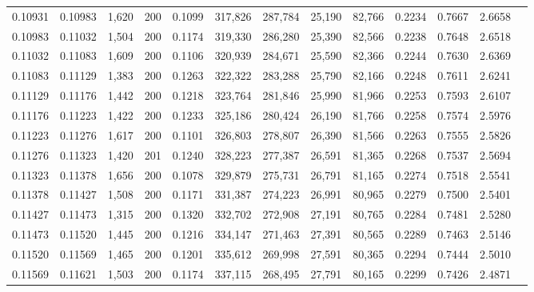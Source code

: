 \begin{tabular}{rrrrrrrrrrrrr}
0.10931 & 0.10983 & 1,620 & 200 &                                     0.1099 & 317,826 & 287,784 &  25,190 &  82,766 & 0.2234 & 0.7667 & 2.6658 \\
0.10983 & 0.11032 & 1,504 & 200 &                                     0.1174 & 319,330 & 286,280 &  25,390 &  82,566 & 0.2238 & 0.7648 & 2.6518 \\
0.11032 & 0.11083 & 1,609 & 200 &                                     0.1106 & 320,939 & 284,671 &  25,590 &  82,366 & 0.2244 & 0.7630 & 2.6369 \\
0.11083 & 0.11129 & 1,383 & 200 &                                     0.1263 & 322,322 & 283,288 &  25,790 &  82,166 & 0.2248 & 0.7611 & 2.6241 \\
0.11129 & 0.11176 & 1,442 & 200 &                                     0.1218 & 323,764 & 281,846 &  25,990 &  81,966 & 0.2253 & 0.7593 & 2.6107 \\
0.11176 & 0.11223 & 1,422 & 200 &                                     0.1233 & 325,186 & 280,424 &  26,190 &  81,766 & 0.2258 & 0.7574 & 2.5976 \\
0.11223 & 0.11276 & 1,617 & 200 &                                     0.1101 & 326,803 & 278,807 &  26,390 &  81,566 & 0.2263 & 0.7555 & 2.5826 \\
0.11276 & 0.11323 & 1,420 & 201 &                                     0.1240 & 328,223 & 277,387 &  26,591 &  81,365 & 0.2268 & 0.7537 & 2.5694 \\
0.11323 & 0.11378 & 1,656 & 200 &                                     0.1078 & 329,879 & 275,731 &  26,791 &  81,165 & 0.2274 & 0.7518 & 2.5541 \\
0.11378 & 0.11427 & 1,508 & 200 &                                     0.1171 & 331,387 & 274,223 &  26,991 &  80,965 & 0.2279 & 0.7500 & 2.5401 \\
0.11427 & 0.11473 & 1,315 & 200 &                                     0.1320 & 332,702 & 272,908 &  27,191 &  80,765 & 0.2284 & 0.7481 & 2.5280 \\
0.11473 & 0.11520 & 1,445 & 200 &                                     0.1216 & 334,147 & 271,463 &  27,391 &  80,565 & 0.2289 & 0.7463 & 2.5146 \\
0.11520 & 0.11569 & 1,465 & 200 &                                     0.1201 & 335,612 & 269,998 &  27,591 &  80,365 & 0.2294 & 0.7444 & 2.5010 \\
0.11569 & 0.11621 & 1,503 & 200 &                                     0.1174 & 337,115 & 268,495 &  27,791 &  80,165 & 0.2299 & 0.7426 & 2.4871 \\

\end{tabular}
